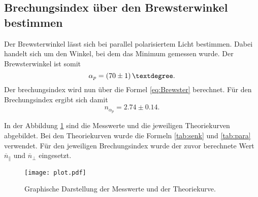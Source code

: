 \subsection{Brechungsindex über den Brewsterwinkel bestimmen}

Der Brewsterwinkel lässt sich bei parallel polarisiertem Licht bestimmen.
Dabei handelt sich um den Winkel, bei dem das Minimum gemessen wurde.
Der Brewsterwinkel ist somit
\begin{equation*}
  \alpha_p = \qty{70 \pm 1}{°}.
\end{equation*}    
Der brechungsindex wird nun über die Formel \ref{eq:Brewster} berechnet.
Für den Brechungsindex ergibt sich damit 
\begin{equation*}
  n_{\alpha_p} = 2.74 \pm 0.14.
\end{equation*}

\noindent In der Abbildung \ref{fig:plot} sind die Messwerte und die jeweiligen Theoriekurven abgebildet.
Bei den Theoriekurven wurde die Formeln \ref{tab:senk} und \ref{tab:para} verwendet.
Für den jeweiligen Brechungsindex wurde der zuvor berechnete Wert $\overline{n}_\parallel$ und $\overline{n}_\perp$ eingesetzt.

\begin{figure}
  \centering
  \texttt{[image: plot.pdf]}
  \caption{Graphische Darstellung der Messwerte und der Theoriekurve.}
  \label{fig:plot}
\end{figure}

